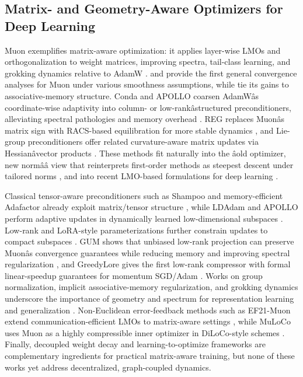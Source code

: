 \documentclass[11pt]{article}
\begin{document}
\subsection{Matrix- and Geometry-Aware Optimizers for Deep Learning}

Muon exemplifies matrix-aware optimization: it applies layer-wise LMOs and orthogonalization to weight matrices, improving spectra, tail-class learning, and grokking dynamics relative to AdamW \citep{wang2025muon, liu2025muon, tveit2025muon, shen2025convergence}. \citet{liu2025muon} and \citet{shen2025convergence} provide the first general convergence analyses for Muon under various smoothness assumptions, while \citet{wang2025muon} tie its gains to associative-memory structure. Conda and APOLLO coarsen AdamWâs coordinate-wise adaptivity into column- or low-rankâstructured preconditioners, alleviating spectral pathologies and memory overhead \citep{wang2025conda, zhu2024apollo}. REG replaces Muonâs matrix sign with RACS-based equilibration for more stable dynamics \citep{liu2025reg}, and Lie-group preconditioners offer related curvature-aware matrix updates via Hessianâvector products \citep{Li2022BlackBL}. These methods fit naturally into the âold optimizer, new normââ view that reinterprets first-order methods as steepest descent under tailored norms \citep{bernstein2024old}, and into recent LMO-based formulations for deep learning \citep{pethick2025training}.

Classical tensor-aware preconditioners such as Shampoo and memory-efficient Adafactor already exploit matrix/tensor structure \citep{gupta2018shampoo, shazeer2018adafactor}, while LDAdam and APOLLO perform adaptive updates in dynamically learned low-dimensional subspaces \citep{Robert2024LDAdamAO, zhu2024apollo}. Low-rank and LoRA-style parameterizations further constrain updates to compact subspaces \citep{bensaid2025singlora, ren2024low}. GUM shows that unbiased low-rank projection can preserve Muonâs convergence guarantees while reducing memory and improving spectral regularization \citep{pan2025unbiased}, and GreedyLore gives the first low-rank compressor with formal linear-speedup guarantees for momentum SGD/Adam \citep{chen2025greedy}. Works on group normalization, implicit associative-memory regularization, and grokking dynamics underscore the importance of geometry and spectrum for representation learning and generalization \citep{wu2018group, Rogozin2021AnAM, tian2025provable}. Non-Euclidean error-feedback methods such as EF21-Muon extend communication-efficient LMOs to matrix-aware settings \citep{Gruntkowska2025ErrorFF}, while MuLoCo uses Muon as a highly compressible inner optimizer in DiLoCo-style schemes \citep{Th'erien2025MuLoCoMI}. Finally, decoupled weight decay \citep{loshchilov2017decoupled} and learning-to-optimize frameworks \citep{He2024AML} are complementary ingredients for practical matrix-aware training, but none of these works yet address decentralized, graph-coupled dynamics.
\end{document}
